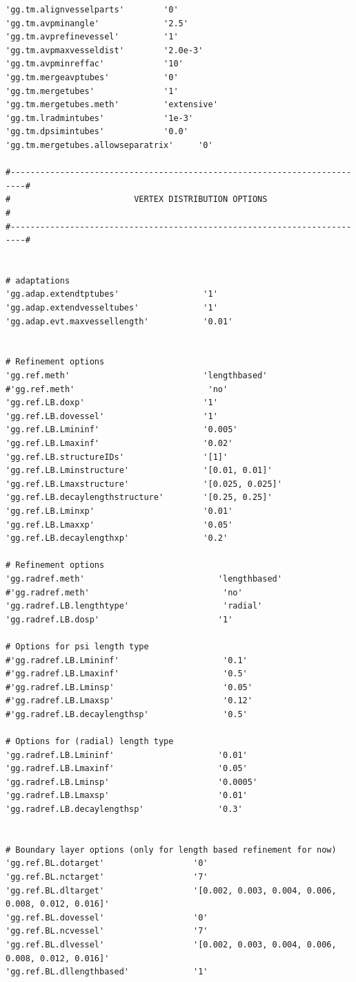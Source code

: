 \documentclass[11pt,a4paper]{article}
\begin{document}
\begin{lstlisting}
'gg.tm.alignvesselparts'        '0'
'gg.tm.avpminangle'             '2.5'
'gg.tm.avprefinevessel'         '1'
'gg.tm.avpmaxvesseldist'        '2.0e-3'
'gg.tm.avpminreffac'            '10'
'gg.tm.mergeavptubes'           '0'
'gg.tm.mergetubes'              '1'
'gg.tm.mergetubes.meth'         'extensive'
'gg.tm.lradmintubes'            '1e-3'
'gg.tm.dpsimintubes'            '0.0'
'gg.tm.mergetubes.allowseparatrix'     '0'

#-------------------------------------------------------------------------#
#                         VERTEX DISTRIBUTION OPTIONS                     #
#-------------------------------------------------------------------------#


# adaptations
'gg.adap.extendtptubes'                 '1'
'gg.adap.extendvesseltubes'             '1'
'gg.adap.evt.maxvessellength'           '0.01'


# Refinement options
'gg.ref.meth'                           'lengthbased'
#'gg.ref.meth'                           'no'
'gg.ref.LB.doxp'                        '1'
'gg.ref.LB.dovessel'                    '1'
'gg.ref.LB.Lmininf'                     '0.005'
'gg.ref.LB.Lmaxinf'                     '0.02'
'gg.ref.LB.structureIDs'                '[1]'
'gg.ref.LB.Lminstructure'               '[0.01, 0.01]'
'gg.ref.LB.Lmaxstructure'               '[0.025, 0.025]'
'gg.ref.LB.decaylengthstructure'        '[0.25, 0.25]'
'gg.ref.LB.Lminxp'                      '0.01'
'gg.ref.LB.Lmaxxp'                      '0.05'
'gg.ref.LB.decaylengthxp'               '0.2'

# Refinement options
'gg.radref.meth'                           'lengthbased'
#'gg.radref.meth'                           'no'
'gg.radref.LB.lengthtype'                   'radial'
'gg.radref.LB.dosp'                        '1'

# Options for psi length type 
#'gg.radref.LB.Lmininf'                     '0.1'
#'gg.radref.LB.Lmaxinf'                     '0.5'
#'gg.radref.LB.Lminsp'                      '0.05'
#'gg.radref.LB.Lmaxsp'                      '0.12'
#'gg.radref.LB.decaylengthsp'               '0.5'

# Options for (radial) length type 
'gg.radref.LB.Lmininf'                     '0.01'
'gg.radref.LB.Lmaxinf'                     '0.05'
'gg.radref.LB.Lminsp'                      '0.0005'
'gg.radref.LB.Lmaxsp'                      '0.01'
'gg.radref.LB.decaylengthsp'               '0.3'


# Boundary layer options (only for length based refinement for now)
'gg.ref.BL.dotarget'                  '0'
'gg.ref.BL.nctarget'                  '7'
'gg.ref.BL.dltarget'                  '[0.002, 0.003, 0.004, 0.006, 0.008, 0.012, 0.016]'
'gg.ref.BL.dovessel'                  '0'
'gg.ref.BL.ncvessel'                  '7'
'gg.ref.BL.dlvessel'                  '[0.002, 0.003, 0.004, 0.006, 0.008, 0.012, 0.016]'
'gg.ref.BL.dllengthbased'             '1'


\end{lstlisting}
\end{document}
